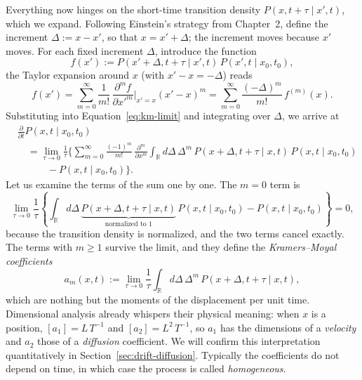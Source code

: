 Everything now hinges on the short-time transition density $P(x,t+\tau\mid x',t)$, which we expand.
Following Einstein's strategy from Chapter~2, define the increment $\Delta := x-x'$, so that $x=x'+\Delta$; the increment moves because $x'$ moves.
For each fixed increment $\Delta$, introduce the function
\begin{equation}
f(x') := P(x'+\Delta,t+\tau\mid x',t)\,P(x',t\mid x_0,t_0),
\end{equation}
the Taylor expansion around $x$ (with $x'-x=-\Delta$) reads
\begin{equation}
f(x') = \sum_{m=0}^{\infty} \frac{1}{m!}\,\frac{\partial^m f}{\partial x'^m}\bigg|_{x'=x}(x'-x)^m
       = \sum_{m=0}^{\infty} \frac{(-\Delta)^m}{m!}\,f^{(m)}(x).
\end{equation}
Substituting into Equation~\eqref{eq:km-limit} and integrating over $\Delta$, we arrive at
\begin{equation}\begin{split}
&\frac{\partial}{\partial t}P(x,t\mid x_0,t_0)\\
&\quad= \lim_{\tau\to0}\frac{1}{\tau}\biggl\{\sum_{m=0}^{\infty}\frac{(-1)^m}{m!}\,\frac{\partial^m}{\partial x^m}\int_{\mathbb{R}} d\Delta\, \Delta^m\, P(x+\Delta,t+\tau\mid x,t)\,P(x,t\mid x_0,t_0)\\
&\qquad\quad - P(x,t\mid x_0,t_0)\biggr\}.
\end{split}\end{equation}
Let us examine the terms of the sum one by one.
The $m=0$ term is
\begin{equation}
\lim_{\tau\to0}\frac{1}{\tau}\left\{\int_{\mathbb{R}} d\Delta\, \underbrace{P(x+\Delta,t+\tau\mid x,t)}_{\text{normalized to } 1}\,P(x,t\mid x_0,t_0) - P(x,t\mid x_0,t_0)\right\} = 0,
\end{equation}
because the transition density is normalized, and the two terms cancel exactly.
The terms with $m\ge1$ survive the limit, and they define the \emph{Kramers--Moyal coefficients}
\begin{equation}
a_m(x,t) := \lim_{\tau\to0}\frac{1}{\tau}\int_{\mathbb{R}} d\Delta\, \Delta^m\, P(x+\Delta,t+\tau\mid x,t),
\end{equation}
which are nothing but the moments of the displacement per unit time.
Dimensional analysis already whispers their physical meaning: when $x$ is a position, $[a_1]=L\,T^{-1}$ and $[a_2]=L^2\,T^{-1}$, so $a_1$ has the dimensions of a \emph{velocity} and $a_2$ those of a \emph{diffusion} coefficient.
We will confirm this interpretation quantitatively in Section~\ref{sec:drift-diffusion}.
Typically the coefficients do not depend on time, in which case the process is called \emph{homogeneous}.

